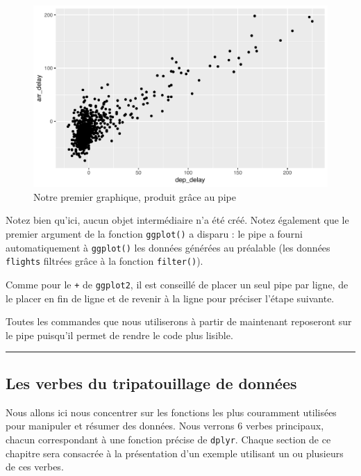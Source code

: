 \documentclass[
  a4paper,
]{article}
\begin{document}
\begin{figure}[htpb]

{\centering \includegraphics[width=0.9\linewidth]{figure/unnamed-chunk-93-1} 

}

\caption{Notre premier graphique, produit grâce au pipe}\label{fig:unnamed-chunk-93}
\end{figure}

Notez bien qu'ici, aucun objet intermédiaire n'a été créé. Notez également que le premier argument de la fonction \texttt{ggplot()} a disparu : le pipe a fourni automatiquement à \texttt{ggplot()} les données générées au préalable (les données \texttt{flights} filtrées grâce à la fonction \texttt{filter()}).

Comme pour le \texttt{+} de \texttt{ggplot2}, il est conseillé de placer un seul pipe par ligne, de le placer en fin de ligne et de revenir à la ligne pour préciser l'étape suivante.

Toutes les commandes que nous utiliserons à partir de maintenant reposeront sur le pipe puisqu'il permet de rendre le code plus lisible.

\begin{center}\rule{0.5\linewidth}{0.5pt}\end{center}

\hypertarget{les-verbes-du-tripatouillage-de-donnuxe9es}{%
\subsection{Les verbes du tripatouillage de données}\label{les-verbes-du-tripatouillage-de-donnuxe9es}}

Nous allons ici nous concentrer sur les fonctions les plus couramment utilisées pour manipuler et résumer des données. Nous verrons 6 verbes principaux, chacun correspondant à une fonction précise de \texttt{dplyr}. Chaque section de ce chapitre sera consacrée à la présentation d'un exemple utilisant un ou plusieurs de ces verbes.
\end{document}
